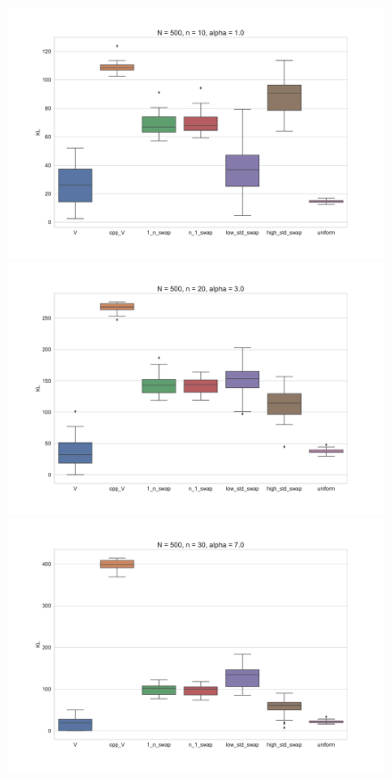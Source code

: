 \documentclass[11pt, oneside]{article}   	%
\begin{document}
\begin{figure}[h!]
	\begin{minipage}[t]{.23\textwidth}
		\centering
		\includegraphics[width=\textwidth]{figures/theorem2_2/N500n10alpha1.pdf}
		
	\end{minipage}
	\hfill
	\begin{minipage}[t]{.23\textwidth}
		\centering
		\includegraphics[width=\textwidth]{figures/theorem2_2/N500n20alpha3.pdf}
		
	\end{minipage} 
	\begin{minipage}[t]{.23\textwidth}
		\centering
		\includegraphics[width=\textwidth]{figures/theorem2_2/N500n30alpha7.pdf}
		

\end{minipage}
\end{figure}
\end{document}
